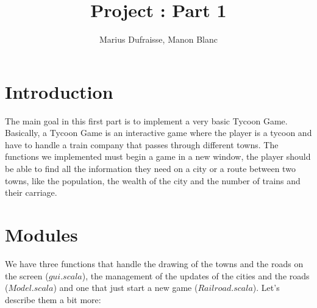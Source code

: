 \documentclass[a4paper]{article}
\title{Project : Part 1}
\author{Marius Dufraisse, Manon Blanc}
\date{ }
\begin{document}
	\maketitle
	\thispagestyle{fancy}
	\section{Introduction}

	The main goal in this first part is to implement a very basic Tycoon Game. Basically, a Tycoon Game is an interactive game where the player is a tycoon and have to handle a train company that passes through different towns. The functions we implemented must begin a game in a new window, the player should be able to find all the information they need on a city or a route between two towns, like the population, the wealth of the city and the number of trains and their carriage.

	\section{Modules}

	We have three functions that handle the drawing of the towns and the roads on the screen ($gui.scala$), the management of the updates of the cities and the roads ($Model.scala$) and one that just start a new game ($Railroad.scala$). Let's describe them a bit more:
\end{document}
